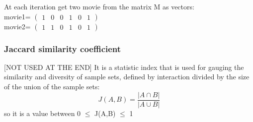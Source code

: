 \documentclass{article}
\begin{document}
At each iteration get two movie from the matrix M as vectors:\\
movie1= $\begin{pmatrix}
      1&0&0&1&0&1
\end{pmatrix}$\\
movie2= $\begin{pmatrix}
      1&1&0&1&0&1
\end{pmatrix}$

\subsubsection{Jaccard similarity coefficient}
[NOT USED AT THE END]
It is a statistic index that is used for gauging the similarity and diversity of sample sets, defined by interaction divided by the size of the union of the sample sets:
\begin{equation}
      J(A,B) = \dfrac{|A\cap B|}{|A\cup B|}
\end{equation}
so it is a value between 0 $\leq$ J(A,B) $\leq$ 1
\end{document}
